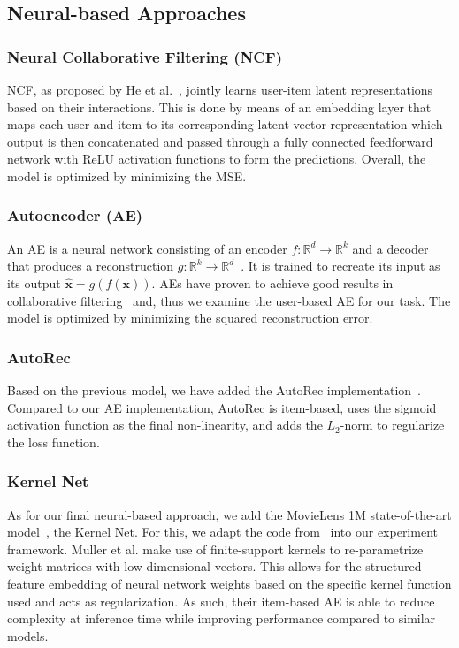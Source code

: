 \documentclass[10pt,conference,compsocconf]{IEEEtran}
\begin{document}
    \subsection{Neural-based Approaches}

    \subsubsection{Neural Collaborative Filtering (NCF)}
    NCF, as proposed by He et al.~\cite{DBLP:journals/corr/abs-1708-05031}, jointly learns user-item latent representations based on their interactions.
    This is done by means of an embedding layer that maps each user and item to its corresponding latent vector representation which output is then concatenated and passed through a fully connected feedforward network with ReLU activation functions to form the predictions.
    Overall, the model is optimized by minimizing the MSE.

    \subsubsection{Autoencoder (AE)}
    An AE is a neural network consisting of an encoder $f: \mathbb{R} ^d \rightarrow \mathbb{R} ^k$ and a
    decoder that produces a reconstruction $g: \mathbb{R} ^k \rightarrow \mathbb{R} ^d$~\cite{Goodfellow-et-al-2016}.
    It is trained to recreate its input as its output $\mathbf{ \hat{x} } = g(f(\mathbf{x}))$.
    AEs have proven to achieve good results in collaborative filtering~\cite{inproceedings} and, thus we examine the user-based AE for our task.
    The model is optimized by minimizing the squared reconstruction error.

    \subsubsection{AutoRec}
    Based on the previous model, we have added the AutoRec implementation~\cite{inproceedings}.
    Compared to our AE implementation, AutoRec is item-based, uses the sigmoid activation function as the final non-linearity, and adds the $L_2$-norm to regularize the loss function.

    \subsubsection{Kernel Net}
    As for our final neural-based approach, we add the MovieLens 1M state-of-the-art model~\cite{noauthor_papers_nodate}, the Kernel Net.
    For this, we adapt the code from~\cite{pmlr-v80-muller18a, kernelNetGithub} into our experiment framework.
    Muller et al. make use of finite-support kernels to re-parametrize weight matrices with low-dimensional vectors.
    This allows for the structured feature embedding of neural network weights based on the specific kernel function used and
    acts as regularization.
    As such, their item-based AE is able to reduce complexity at inference time while improving performance compared to similar models\cite{pmlr-v80-muller18a}.
\end{document}
